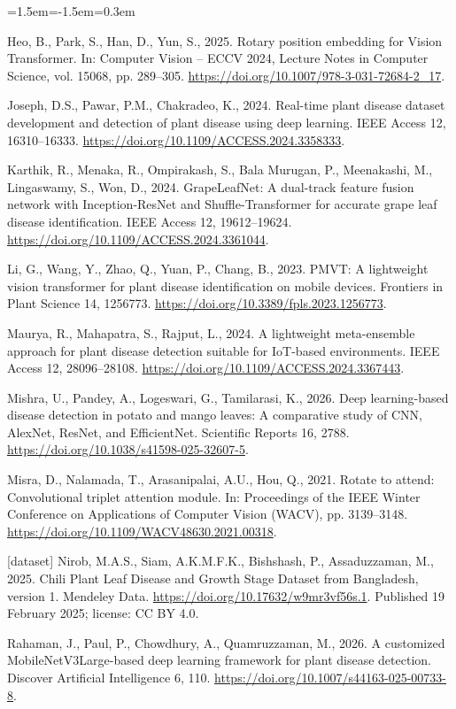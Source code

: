 \begin{list}{}{\leftmargin=1.5em\itemindent=-1.5em\itemsep=0.3em}
\item Heo, B., Park, S., Han, D., Yun, S., 2025. Rotary position embedding for Vision Transformer. In: Computer Vision -- ECCV 2024, Lecture Notes in Computer Science, vol. 15068, pp. 289--305. \url{https://doi.org/10.1007/978-3-031-72684-2_17}.
\item Joseph, D.S., Pawar, P.M., Chakradeo, K., 2024. Real-time plant disease dataset development and detection of plant disease using deep learning. IEEE Access 12, 16310--16333. \url{https://doi.org/10.1109/ACCESS.2024.3358333}.
\item Karthik, R., Menaka, R., Ompirakash, S., Bala Murugan, P., Meenakashi, M., Lingaswamy, S., Won, D., 2024. GrapeLeafNet: A dual-track feature fusion network with Inception-ResNet and Shuffle-Transformer for accurate grape leaf disease identification. IEEE Access 12, 19612--19624. \url{https://doi.org/10.1109/ACCESS.2024.3361044}.
\item Li, G., Wang, Y., Zhao, Q., Yuan, P., Chang, B., 2023. PMVT: A lightweight vision transformer for plant disease identification on mobile devices. Frontiers in Plant Science 14, 1256773. \url{https://doi.org/10.3389/fpls.2023.1256773}.
\item Maurya, R., Mahapatra, S., Rajput, L., 2024. A lightweight meta-ensemble approach for plant disease detection suitable for IoT-based environments. IEEE Access 12, 28096--28108. \url{https://doi.org/10.1109/ACCESS.2024.3367443}.
\item Mishra, U., Pandey, A., Logeswari, G., Tamilarasi, K., 2026. Deep learning-based disease detection in potato and mango leaves: A comparative study of CNN, AlexNet, ResNet, and EfficientNet. Scientific Reports 16, 2788. \url{https://doi.org/10.1038/s41598-025-32607-5}.
\item Misra, D., Nalamada, T., Arasanipalai, A.U., Hou, Q., 2021. Rotate to attend: Convolutional triplet attention module. In: Proceedings of the IEEE Winter Conference on Applications of Computer Vision (WACV), pp. 3139--3148. \url{https://doi.org/10.1109/WACV48630.2021.00318}.
\item {[}dataset{]} Nirob, M.A.S., Siam, A.K.M.F.K., Bishshash, P., Assaduzzaman, M., 2025. Chili Plant Leaf Disease and Growth Stage Dataset from Bangladesh, version 1. Mendeley Data. \url{https://doi.org/10.17632/w9mr3vf56s.1}. Published 19 February 2025; license: CC BY 4.0.
\item Rahaman, J., Paul, P., Chowdhury, A., Quamruzzaman, M., 2026. A customized MobileNetV3Large-based deep learning framework for plant disease detection. Discover Artificial Intelligence 6, 110. \url{https://doi.org/10.1007/s44163-025-00733-8}.

\end{list}

